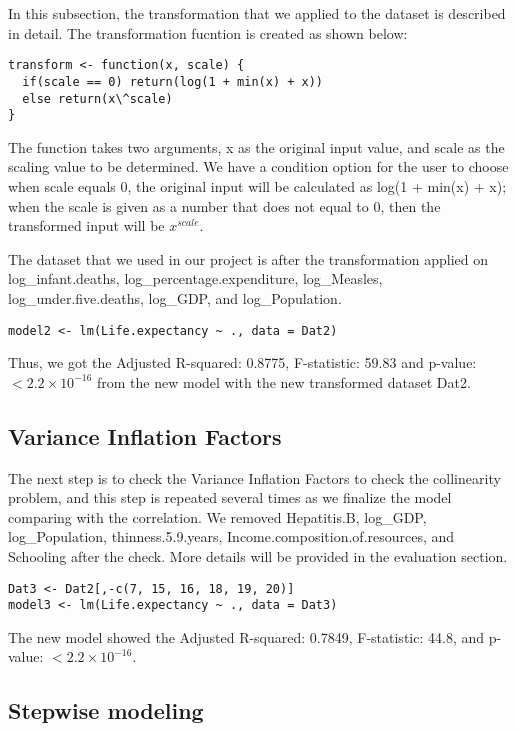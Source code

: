 In this subsection, the transformation that we applied to the dataset is described in detail. The transformation fucntion is created as shown below:

\begin{verbatim}
transform <- function(x, scale) {
  if(scale == 0) return(log(1 + min(x) + x))
  else return(x\^scale)
}
\end{verbatim}

The function takes two arguments, x as the original input value, and scale as the scaling value to be determined. We have a condition option for the user to choose when scale equals 0, the original input will be calculated as log(1 + min(x) + x); when the scale is given as a number that does not equal to 0, then the transformed input will be $x^{scale}$.

The dataset that we used in our project is after the transformation applied on log\_infant.deaths, log\_percentage.expenditure, log\_Measles, log\_under.five.deaths, log\_GDP, and log\_Population.

\begin{verbatim}
model2 <- lm(Life.expectancy ~ ., data = Dat2)
\end{verbatim}

Thus, we got the Adjusted R-squared: 0.8775, F-statistic: 59.83 and p-value: $< 2.2\times 10^{-16}$ from the new model with the new transformed dataset Dat2.

\subsection{Variance Inflation Factors}

The next step is to check the Variance Inflation Factors to check the collinearity problem, and this step is repeated several times as we finalize the model comparing with the correlation. We removed Hepatitis.B, log\_GDP, log\_Population, thinness.5.9.years, Income.composition.of.resources, and Schooling after the check. More details will be provided in the evaluation section.


\begin{verbatim}
Dat3 <- Dat2[,-c(7, 15, 16, 18, 19, 20)]
model3 <- lm(Life.expectancy ~ ., data = Dat3)
\end{verbatim}
The new model showed the Adjusted R-squared: 0.7849, F-statistic:  44.8, and p-value: $< 2.2\times 10^{-16}$.


\subsection{Stepwise modeling}

